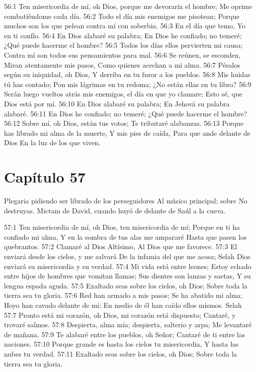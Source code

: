 56:1 Ten misericordia de mí, oh Dios, porque me devoraría el hombre; 
Me oprime combatiéndome cada día. 
56:2 Todo el día mis enemigos me pisotean; 
Porque muchos son los que pelean contra mí con soberbia. 
56:3 En el día que temo, 
Yo en ti confío. 
56:4 En Dios alabaré su palabra; 
En Dios he confiado; no temeré; 
¿Qué puede hacerme el hombre? 
56:5 Todos los días ellos pervierten mi causa; 
Contra mí son todos sus pensamientos para mal. 
56:6 Se reúnen, se esconden, 
Miran atentamente mis pasos, 
Como quienes acechan a mi alma. 
56:7 Pésalos según su iniquidad, oh Dios, 
Y derriba en tu furor a los pueblos. 
56:8 Mis huidas tú has contado; 
Pon mis lágrimas en tu redoma; 
¿No están ellas en tu libro? 
56:9 Serán luego vueltos atrás mis enemigos, el día en que yo clamare; 
Esto sé, que Dios está por mí. 
56:10 En Dios alabaré su palabra; 
En Jehová su palabra alabaré. 
56:11 En Dios he confiado; no temeré; 
¿Qué puede hacerme el hombre? 
56:12 Sobre mí, oh Dios, están tus votos; 
Te tributaré alabanzas. 
56:13 Porque has librado mi alma de la muerte, 
Y mis pies de caída, 
Para que ande delante de Dios 
En la luz de los que viven. 
\section*{Capítulo 57}
Plegaria pidiendo ser librado de los perseguidores 
Al músico principal; sobre No destruyas. Mictam de David, cuando huyó de delante de Saúl a la cueva. 
 
57:1 Ten misericordia de mí, oh Dios, ten misericordia de mí; 
Porque en ti ha confiado mi alma, 
Y en la sombra de tus alas me ampararé 
Hasta que pasen los quebrantos. 
57:2 Clamaré al Dios Altísimo, 
Al Dios que me favorece. 
57:3 El enviará desde los cielos, y me salvará 
De la infamia del que me acosa; Selah 
Dios enviará su misericordia y su verdad. 
57:4 Mi vida está entre leones; 
Estoy echado entre hijos de hombres que vomitan llamas; 
Sus dientes son lanzas y saetas, 
Y su lengua espada aguda. 
57:5 Exaltado seas sobre los cielos, oh Dios; 
Sobre toda la tierra sea tu gloria. 
57:6 Red han armado a mis pasos; 
Se ha abatido mi alma; 
Hoyo han cavado delante de mí; 
En medio de él han caído ellos mismos. Selah 
57:7 Pronto está mi corazón, oh Dios, mi corazón está dispuesto; 
Cantaré, y trovaré salmos. 
57:8 Despierta, alma mía; despierta, salterio y arpa; 
Me levantaré de mañana. 
57:9 Te alabaré entre los pueblos, oh Señor; 
Cantaré de ti entre las naciones. 
57:10 Porque grande es hasta los cielos tu misericordia, 
Y hasta las nubes tu verdad. 
57:11 Exaltado seas sobre los cielos, oh Dios; 
Sobre toda la tierra sea tu gloria. 
